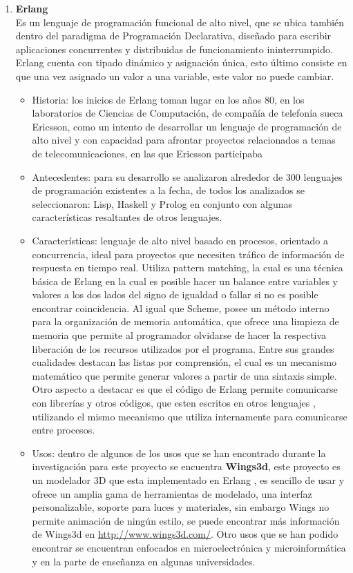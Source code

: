 \documentclass[12pt,a4paper]{article}
\begin{document}
\begin{enumerate}
\begin{itemize}
	\end{itemize}
 \item  \textbf{Erlang} \\
 Es un lenguaje de programación funcional de alto nivel, que se ubica también dentro del paradigma de Programación Declarativa, diseñado para escribir aplicaciones concurrentes y distribuidas de funcionamiento ininterrumpido. Erlang cuenta con tipado dinámico y asignación única, esto último consiste en que una vez asignado un valor a una variable, este valor no puede cambiar.
 \begin{itemize}
 \item Historia: los inicios de Erlang toman lugar en los años 80, en los laboratorios de Ciencias de Computación, de compañía de telefonía sueca Ericsson, como un intento de desarrollar un lenguaje de programación de alto nivel y con capacidad para afrontar proyectos relacionados a temas de telecomunicaciones, en las que Ericsson participaba 
 \item Antecedentes: para su desarrollo se analizaron alrededor de 300 lenguajes de programación existentes a la fecha, de todos los analizados se seleccionaron: Lisp, Haskell y Prolog en conjunto con algunas características resaltantes de otros lenguajes. 
 \item Características: lenguaje de alto nivel basado en procesos, orientado a concurrencia, ideal para proyectos que necesiten tráfico de información de respuesta en tiempo real. Utiliza pattern matching, la cual es una técnica básica de Erlang en la cual es posible hacer un balance entre variables y valores a los dos lados del signo de igualdad o fallar si no es posible encontrar coincidencia. Al igual que Scheme, posee un método interno para la organización de memoria automática, que ofrece una limpieza de memoria que permite al programador olvidarse de hacer la respectiva liberación de los recursos utilizados por el programa. Entre sus grandes cualidades destacan las listas por comprensión, el cual es un mecanismo matemático que permite generar valores a partir de una sintaxis simple. Otro aspecto a destacar es que el código de Erlang permite comunicarse con librerías  y otros códigos, que esten escritos en otros lenguajes , utilizando el mismo mecanismo que utiliza internamente para comunicarse entre procesos.
 \item Usos: dentro de algunos de los usos que se han encontrado durante la investigación para este proyecto se encuentra   \textbf{Wings3d}, este proyecto es un modelador 3D que esta implementado en Erlang , es sencillo de usar y ofrece un amplia gama de herramientas de modelado, una interfaz personalizable, soporte para luces y materiales, sin embargo Wings no permite animación de ningún estilo, se puede encontrar más información de Wings3d en \url{http://www.wings3d.com/}. Otro usos que se han podido encontrar se encuentran enfocados en microelectrónica y microinformática y en la parte de enseñanza en algunas universidades.

\end{itemize}
\end{enumerate}
\end{document}
